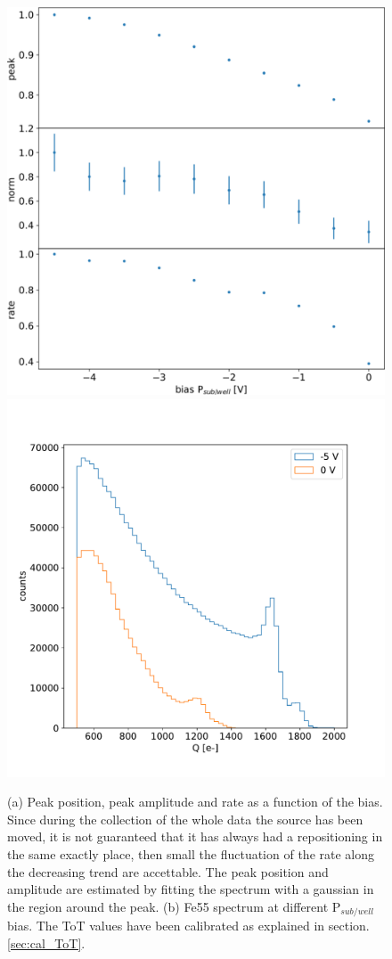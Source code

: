         \begin{figure}[h!]
            \centering
            \includegraphics[width=.50\linewidth]{figures/charaterization/Fe_param_vs_bias.pdf}
            \includegraphics[width=.49\linewidth]{figures/charaterization/Fe_spectrum_bias.pdf}
            \caption{(a) Peak position, peak amplitude and rate as a function of the bias. Since during the collection of the whole data the source has been moved, it is not guaranteed that it has always had a repositioning in the same exactly place, then small the fluctuation of the rate along the decreasing trend are accettable. The peak position and amplitude are estimated by fitting the spectrum with a gaussian in the region around the peak. (b) Fe55 spectrum at different P$_{sub/well}$ bias. The ToT values have been calibrated as explained in section. \ref{sec:cal_ToT}.}
            \label{fig:Fe_param_vs_bias}
        \end{figure}     

